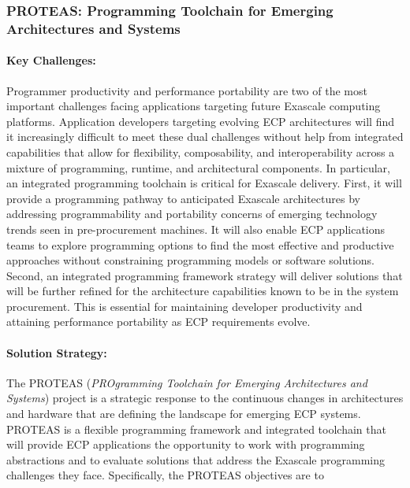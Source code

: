 \subsubsection{ PROTEAS: Programming Toolchain for Emerging Architectures and Systems} 


\paragraph{Key  Challenges:}
Programmer productivity and performance portability are two of the most important challenges facing applications targeting future Exascale computing platforms. Application developers targeting evolving ECP architectures will find it increasingly difficult to meet these dual challenges without help from integrated capabilities that allow for flexibility, composability, and interoperability across a mixture of programming, runtime, and architectural components. In particular, an integrated programming toolchain is critical for Exascale delivery. First, it will provide a programming pathway to anticipated Exascale architectures by addressing programmability and portability concerns of emerging technology trends seen in pre-procurement machines. It will also enable ECP applications teams to explore programming options to find the most effective and productive approaches without constraining programming models or software solutions. Second, an integrated programming framework strategy will deliver solutions that will be further refined for the architecture capabilities known to be in the system procurement. This is essential for maintaining developer productivity and attaining performance portability as ECP requirements evolve.


\paragraph{Solution Strategy:}
The PROTEAS (\textit{PROgramming Toolchain for Emerging Architectures and Systems}) project is a strategic response to the continuous changes in architectures and hardware that are defining the landscape for emerging ECP systems. PROTEAS is a flexible programming framework and integrated toolchain that will provide ECP applications the opportunity to work with programming abstractions and to evaluate solutions that address the Exascale programming challenges they face. Specifically, the PROTEAS objectives are to

